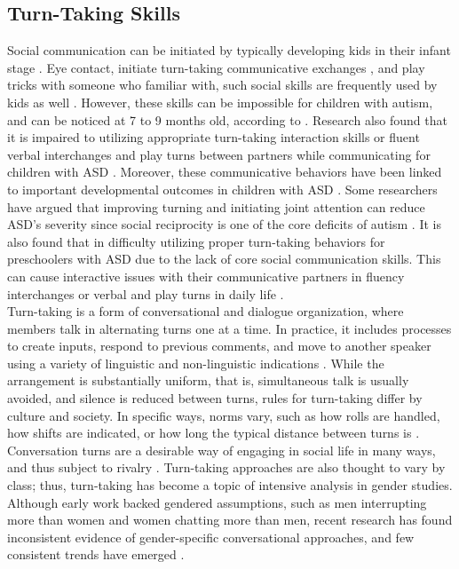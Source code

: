 \subsection{Turn-Taking Skills}
Social communication can be initiated by typically developing kids in their infant 
stage \cite{neel1990social}. Eye contact, initiate turn-taking communicative exchanges 
, and play tricks with someone who familiar with, such social skills are frequently used
by kids as well \cite{brazelton1974origins, trevarthen1978secondary, reddy1991playing}.
However, these skills can be impossible for children with autism, and can be noticed at
7 to 9 months old, according to \cite{lord1984development, mundy1986defining}. Research
also found that it is impaired to utilizing appropriate turn-taking interaction skills
or fluent verbal interchanges and play turns between partners while communicating for 
children with ASD \cite{kaczmarek2002assessment}. Moreover, these communicative behaviors 
have been linked to important developmental outcomes in children with ASD \cite{mcduffie2004relationship, sigman1999continuity, stone2001predicting}. Some researchers have argued that improving turning and initiating 
joint attention can reduce ASD's severity since social reciprocity is one of the core 
deficits of autism \cite{aldred2004new, mundy1997joint}. It is also found that in difficulty 
utilizing proper turn-taking behaviors for preschoolers with ASD due to the lack of core 
social communication skills. This can cause interactive issues with their communicative 
partners in fluency interchanges or verbal and play turns in daily life \cite{kaczmarek2002assessment, edition2013diagnostic}.\\

Turn-taking is a form of conversational and dialogue organization, where members talk 
in alternating turns one at a time. In practice, it includes processes to create inputs, 
respond to previous comments, and move to another speaker using a variety of linguistic 
and non-linguistic indications \cite{wolff1964behavioural}. While the arrangement is 
substantially uniform, that is, simultaneous talk is usually avoided, and silence is 
reduced between turns, rules for turn-taking differ by culture and society. In specific 
ways, norms vary, such as how rolls are handled, how shifts are indicated, or how long the 
typical distance between turns is \cite{pierno2008robotic, tang2011enhancing}. Conversation 
turns are a desirable way of engaging in social life in many ways, and thus subject to 
rivalry \cite{villano2011domer}. Turn-taking approaches are also thought to vary by class; 
thus, turn-taking has become a topic of intensive analysis in gender studies. Although early 
work backed gendered assumptions, such as men interrupting more than women and women chatting 
more than men, recent research has found inconsistent evidence of gender-specific conversational 
approaches, and few consistent trends have emerged \cite{feil2005defining, fong2003survey}. \\

